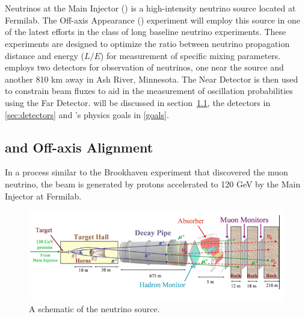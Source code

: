 \chapter{\nova}
\label{nova_chapter}
Neutrinos at the Main Injector (\numi) is a high-intensity neutrino source located at Fermilab.  The \numi Off-axis \nue Appearance (\nova) experiment will employ this source in one of the latest efforts in the class of long baseline neutrino experiments.  These experiments are designed to optimize the ratio between neutrino propagation distance and energy ($L/E$) for measurement of specific mixing parameters.  \nova employs two detectors for observation of neutrinos, one near the source and another 810 km away in Ash River, Minnesota.  The Near Detector is then used to constrain beam fluxes to aid in the measurement of oscillation probabilities using the Far Detector.  \numi will be discussed in section~\ref{sec:numi}, the detectors in \ref{sec:detectors} and \nova's physics goals in \ref{goals}. 

\section{\numi and  Off-axis Alignment }\label{sec:numi}

In a process similar to the Brookhaven experiment that discovered the muon neutrino, the \numi beam is generated by protons accelerated to 120 GeV by the Main Injector at Fermilab.  
\begin{figure}[t]
  \begin{center}
    \includegraphics[width=\textwidth]{figures/figures/numi.png}
  \end{center}
  \caption{A schematic of the \numi neutrino source.}
  \label{numi}
\end{figure}


